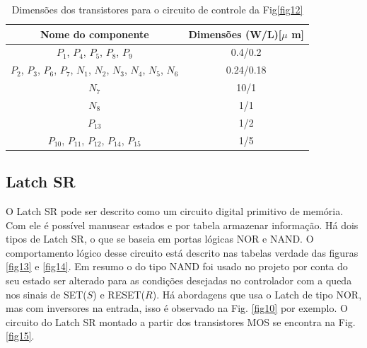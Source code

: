 \begin{table}[htb]
\centering
\begin{tabular}{c|c}
\hline 
\hline 
\textbf{Nome do componente} & \textbf{Dimensões (W/L)[$\mu$ m]} \\ 
\hline 
\hline 
$P_{1}$, $P_{4}$, $P_{5}$, $P_{8}$, $P_{9}$ & 0.4/0.2 \\ \hline
$P_{2}$, $P_{3}$, $P_{6}$, $P_{7}$, $N_{1}$, $N_{2}$, $N_{3}$, $N_{4}$, $N_{5}$, $N_{6}$  & 0.24/0.18 \\ \hline
$N_7$ & 10/1 \\ \hline
$N_{8}$ & 1/1 \\ \hline

$P_13$ & 1/2 \\ \hline 
$P_{10}$, $P_{11}$, $P_{12}$, $P_{14}$, $P_{15}$  & 1/5 \\ 
\hline 
\end{tabular} 
\caption{Dimensões dos transistores para o circuito de controle da Fig\ref{fig12}}
\label{tab:control}
\end{table}

\subsection{Latch SR}

O Latch SR pode ser descrito como um circuito digital primitivo de memória. Com ele é possível manusear estados e por tabela armazenar informação. Há dois tipos de Latch SR, o que se baseia em portas lógicas NOR e NAND.
O comportamento lógico desse circuito está descrito nas tabelas verdade das figuras \ref{fig13} e \ref{fig14}. Em resumo o do tipo NAND foi usado no projeto por conta do seu estado ser alterado para as condições desejadas no controlador com a queda nos sinais de SET($S$) e RESET($R$). Há abordagens que usa o Latch de tipo NOR, mas com inversores na entrada, isso é observado na Fig. \ref{fig10} por exemplo. 
O circuito do Latch SR montado a partir dos transistores MOS se encontra na Fig. \ref{fig15}. 


